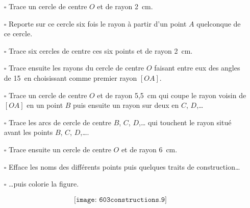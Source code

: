 \begin{itemize}
\item[$\square$] Trace un cercle de centre $O$ et de rayon 2~cm.
\item[$\square$] Reporte sur ce cercle six fois le rayon à partir d'un
point $A$ quelconque de ce cercle.
\item[$\square$] Trace six cercles de centre ces six points et de
rayon 2~cm.
\item[$\square$] Trace ensuite les rayons du cercle de centre $O$
faisant entre eux des angles de 15\degres\ en choisissant comme premier
rayon $[OA]$.
\item[$\square$] Trace un cercle de centre $O$ et de rayon 5,5~cm qui
coupe le rayon voisin de $[OA]$ en un point $B$ puis ensuite un rayon
sur deux en $C$, $D$,\ldots
\item[$\square$] Trace les arcs de cercle de centre $B$, $C$,
$D$,\ldots{} qui touchent le rayon situé avant les points $B$, $C$,
$D$,\ldots.
\item[$\square$] Trace ensuite un cercle de centre $O$ et de rayon
6~cm.
\item[$\square$] Efface les noms des différents points puis quelques
traits de construction\ldots
\item[$\square$] \ldots puis colorie la figure.
\end{itemize}
\[\texttt{[image: 603constructions.9]}\]
